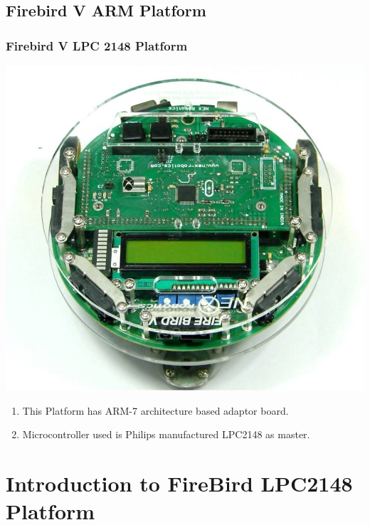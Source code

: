 \documentclass[10pt,red]{beamer}
\begin{document}
\subsection{Firebird V ARM Platform}
\begin{frame}
	\frametitle{Firebird V LPC 2148 Platform} \pause
		\begin{minipage}[c]{0.4\textwidth}
			\includegraphics[width=\linewidth]{fb_v_arm}
		\end{minipage}
	\pause
	\hfill
		\begin{minipage}[c]{0.5\textwidth}
			\begin{enumerate}
				\item <+-|alert@+> This Platform has ARM-7 architecture based adaptor board.
				\item <+-|alert@+> Microcontroller used is Philips manufactured LPC2148 as master.
			\end{enumerate}
		\end{minipage}   
\end{frame}



\section{Introduction to FireBird LPC2148 Platform}
\end{document}
